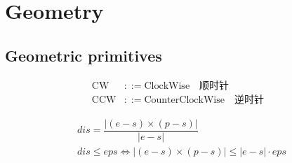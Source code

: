 \chapter{Geometry}

\section{Geometric primitives}
	\begin{lecture}{}
	\[
	\begin{aligned}
		\mathrm{CW} &::= \mathrm{ClockWise} \quad \text{顺时针}\\
		\mathrm{CCW} &::= \mathrm{CounterClockWise} \quad \text{逆时针}&
	\end{aligned}
	\]	
	\end{lecture}
	
	\begin{lecture}{}
		\[
		\begin{array}{c}
			dis = \dfrac{|(e - s) \times (p - s)|}{|e - s|}\\
			dis \leq eps \Leftrightarrow |(e - s) \times (p - s)| \leq |e - s| \cdot eps
		\end{array}
		\]
	\end{lecture}

	

